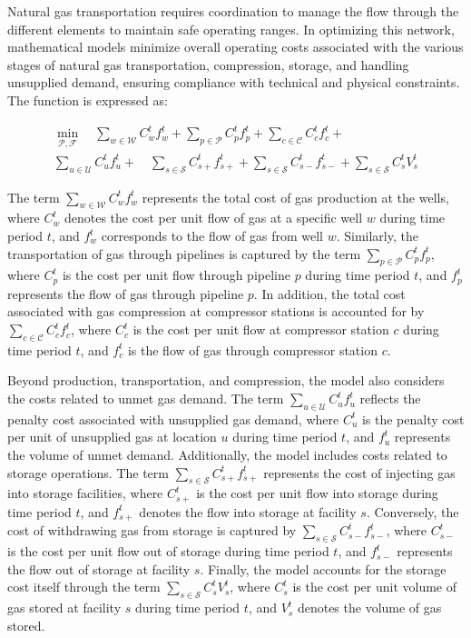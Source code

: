 Natural gas transportation requires coordination to manage the flow through the different elements to maintain safe operating ranges. In optimizing this network, mathematical models minimize overall operating costs associated with the various stages of natural gas transportation, compression, storage, and handling unsupplied demand, ensuring compliance with technical and physical constraints. The function is expressed as:

\begin{equation} \label{eq:obj_func_integrated}
\begin{split}
\min_{\mathcal{P}, \mathcal{F}} \quad  \sum_{w \in \mathcal{W}} C_{w}^t {f_{w}^t} + \sum_{p \in \mathcal{P}} C_{p}^t {f_{p}^t} + \sum_{c \in \mathcal{C}} C_{c}^t {f_{c}^t} + \\ \sum_{u \in \mathcal{U}} C_{u}^{t} {f_{u}^{t}} + \quad \sum_{s \in \mathcal{S}} C_{s+}^{t} {f_{s+}^{t}}  + \sum_{s \in \mathcal{S}} C_{s-}^{t} {f_{s-}^{t}} + \sum_{s \in \mathcal{S}} C_{s}^{t} {V_{s}^{t}}
\end{split}
\end{equation}

The term $\sum_{w \in \mathcal{W}} C_{w}^t {f_{w}^t}$ represents the total cost of gas production at the wells, where $C_{w}^t$ denotes the cost per unit flow of gas at a specific well $w$ during time period $t$, and $f_{w}^t$ corresponds to the flow of gas from well $w$. Similarly, the transportation of gas through pipelines is captured by the term $\sum_{p \in \mathcal{P}} C_{p}^t {f_{p}^t}$, where $C_{p}^t$ is the cost per unit flow through pipeline $p$ during time period $t$, and $f_{p}^t$ represents the flow of gas through pipeline $p$. In addition, the total cost associated with gas compression at compressor stations is accounted for by $\sum_{c \in \mathcal{C}} C_{c}^t {f_{c}^t}$, where $C_{c}^t$ is the cost per unit flow at compressor station $c$ during time period $t$, and $f_{c}^t$ is the flow of gas through compressor station $c$.

Beyond production, transportation, and compression, the model also considers the costs related to unmet gas demand. The term $\sum_{u \in \mathcal{U}} C_{u}^{t} {f_{u}^{t}}$ reflects the penalty cost associated with unsupplied gas demand, where $C_{u}^{t}$ is the penalty cost per unit of unsupplied gas at location $u$ during time period $t$, and $f_{u}^{t}$ represents the volume of unmet demand. Additionally, the model includes costs related to storage operations. The term $\sum_{s \in \mathcal{S}} C_{s+}^{t} {f_{s+}^{t}}$ represents the cost of injecting gas into storage facilities, where $C_{s+}^{t}$ is the cost per unit flow into storage during time period $t$, and $f_{s+}^{t}$ denotes the flow into storage at facility $s$. Conversely, the cost of withdrawing gas from storage is captured by $\sum_{s \in \mathcal{S}} C_{s-}^{t} {f_{s-}^{t}}$, where $C_{s-}^{t}$ is the cost per unit flow out of storage during time period $t$, and $f_{s-}^{t}$ represents the flow out of storage at facility $s$. Finally, the model accounts for the storage cost itself through the term $\sum_{s \in \mathcal{S}} C_{s}^{t} {V_{s}^{t}}$, where $C_{s}^{t}$ is the cost per unit volume of gas stored at facility $s$ during time period $t$, and $V_{s}^{t}$ denotes the volume of gas stored. 


